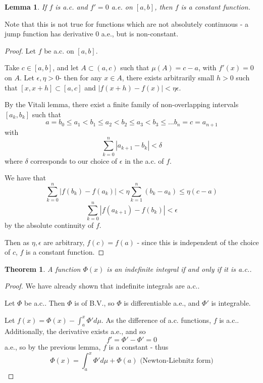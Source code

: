 \documentclass[11pt,a4paper]{report}
\newtheorem{lemma}[theorem]{Lemma}
\theoremstyle{plain}
\newtheorem{thm}{Theorem}[section]
\theoremstyle{definition}
\theoremstyle{remark}
\newcommand{\abs}[1]{\left| #1 \right|}
\begin{document}
\begin{lemma}
  If $f$ is a.c. and $f' = 0$ a.e. on $[a, b]$, then $f$ is a constant function.
\end{lemma}

Note that this is not true for functions which are not absolutely continuous - a jump function has derivative 0 a.e., but is non-constant.

\begin{proof}
  Let $f$ be a.c. on $[a, b]$.

    Take $c \in [a, b]$, and let $A \subset (a, c)$ such that $\mu(A) = c - a$, with $f'(x) = 0$ on $A$. Let $\epsilon, \eta > 0$- then for any $x \in A$, there exists arbitrarily small $h > 0$ such that $ [x, x+h] \subset [a, c] $ and $\abs{f(x+h) - f(x)} < \eta\epsilon$.

    By the Vitali lemma, there exist a finite family of non-overlapping intervals $[a_k, b_k]$ such that
  $$ a = b_0 \le a_1 < b_1 \le a_2 < b_2 \le a_3 < b_3 \le \dots b_n = c = a_{n+1} $$
  with
  $$ \sum_{k=0}^n \abs{a_{k+1} - b_k} < \delta$$
  where $\delta$ corresponds to our choice of $\epsilon$ in the a.c. of $f$.

  We have that
  $$ \sum_{k=0}^n \abs{f(b_k) - f(a_k)} < \eta\sum_{k=1}^n (b_k - a_k) \le \eta(c - a) $$
  $$ \sum_{k=0}^n \abs{f(a_{k+1}) - f(b_k)} < \epsilon $$
  by the absolute continuity of $f$.

  Then as $\eta, \epsilon$ are arbitrary, $f(c) = f(a)$ - since this is independent of the choice of $c$, $f$ is a constant function.
\end{proof}

\begin{thm}
  A function $\Phi(x)$ is an indefinite integral if and only if it is a.c..
\end{thm}

\begin{proof}
  We have already shown that indefinite integrals are a.c..

  Let $\Phi$ be a.c.. Then $\Phi$ is of B.V., so $\Phi$ is differentiable a.e., and $\Phi'$ is integrable.

  Let $f(x) = \Phi(x) - \int_a^x \Phi' d\mu$. As the difference of a.c. functions, $f$ is a.c.. Additionally, the derivative exists a.e., and so
  $$ f' = \Phi' - \Phi' = 0 $$
  a.e., so by the previous lemma, $f$ is a constant - thus
  $$ \Phi(x) = \int_a^x \Phi' d\mu + \Phi(a) \text{ (Newton-Liebnitz form)} $$
\end{proof}
\end{document}
